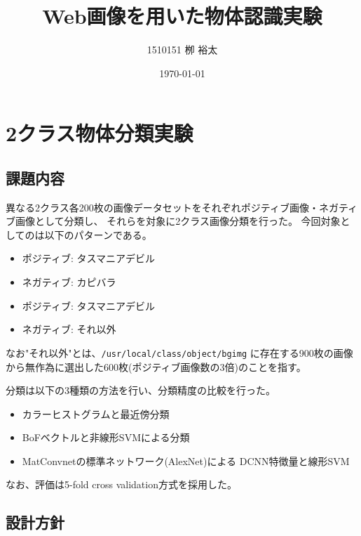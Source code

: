 \documentclass[11pt,a4paper, uplatex]{jsreport}
\title{Web画像を用いた物体認識実験}
\author{1510151  栁 裕太}
\date{\today}
\begin{document}
\maketitle
\thispagestyle{empty}
\tableofcontents
\chapter{2クラス物体分類実験}
\section{課題内容}
異なる2クラス各200枚の画像データセットをそれぞれポジティブ画像・ネガティブ画像として分類し、
それらを対象に2クラス画像分類を行った。
今回対象としてのは以下のパターンである。
\begin{itemize}
  \item ポジティブ: タスマニアデビル
  \item ネガティブ: カピバラ
\end{itemize}
\begin{itemize}
  \item ポジティブ: タスマニアデビル
  \item ネガティブ: それ以外
\end{itemize}
なお"それ以外"とは、\texttt{/usr/local/class/object/bgimg}
に存在する900枚の画像から無作為に選出した600枚(ポジティブ画像数の3倍)のことを指す。

分類は以下の3種類の方法を行い、分類精度の比較を行った。
\begin{itemize}
  \item カラーヒストグラムと最近傍分類
  \item BoFベクトルと非線形SVMによる分類
  \item MatConvnetの標準ネットワーク(AlexNet)による DCNN特徴量と線形SVM
\end{itemize}

なお、評価は5-fold cross validation方式を採用した。

\section{設計方針}
\end{document}
